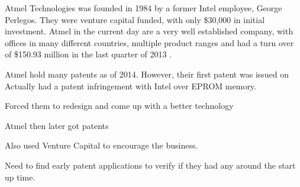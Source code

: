 
{}


Atmel Technologies was founded in 1984 by a former Intel employee, George Perlegos.
They were venture capital funded, with only \$30,000 in initial investment.
Atmel in the current day are a very well established company, with offices in many different countries, multiple product ranges and had a turn over of \$150.93 million in the last quarter of 2013 \cite{atmel:profit}.

Atmel hold many patents as of 2014. 
However, their first patent was issued on
Actually had a patent infringement with Intel over EPROM memory. 

Forced them to redesign and come up with a better technology

Atmel then later got patents

Also used Venture Capital to encourage the business.

Need to find early patent applications to verify if they had any around the start up time.



